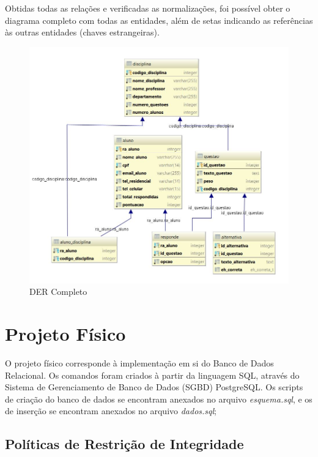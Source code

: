 \documentclass[12pt,a4paper]{article}
\begin{document}
Obtidas todas as relações e verificadas as normalizações, foi possível obter o diagrama completo com todas as entidades, além de setas indicando as referências às outras entidades (chaves estrangeiras).

\begin{center}
\begin{figure}[h]
    \centering
    \includegraphics[width=\linewidth]{mapeamento.jpg}
    \caption{DER Completo}
    \label{fig:DERcompleto}
\end{figure}
\end{center}

\section{Projeto Físico}

O projeto físico corresponde à implementação em si do Banco de Dados Relacional. Os comandos foram criados à partir da linguagem SQL, através do Sistema de Gerenciamento de Banco de Dados (SGBD) PostgreSQL. Os scripts de criação do banco de dados se encontram anexados no arquivo \textit{esquema.sql}, e os de inserção se encontram anexados no arquivo \textit{dados.sql};

\subsection{Políticas de Restrição de Integridade}
\end{document}
